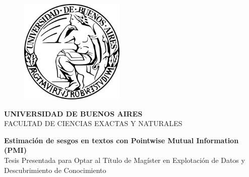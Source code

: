
\begin{titlepage}



    \begin{figure}[!htb]
        \centering
        \includegraphics[width=5cm]{img/institucional/UBA.svg.png}
    \end{figure}


    \begin{center}
        \Large{\textbf{UNIVERSIDAD DE BUENOS AIRES}}
        \vspace{3mm}
        \\ \normalsize{FACULTAD DE CIENCIAS EXACTAS Y NATURALES}
        \vspace{6mm}
    \end{center}


    \vspace{8mm}
    \begin{center}
        \LARGE{\textbf{Estimación de sesgos en textos con Pointwise Mutual Information (PMI)}}
        \vspace{13mm}
        \\ \normalsize{Tesis Presentada para Optar al Título de Magíster en Explotación de Datos y Descubrimiento de Conocimiento}
        \vspace{13mm}
    \end{center}

    \vspace{20mm}


\end{titlepage}
